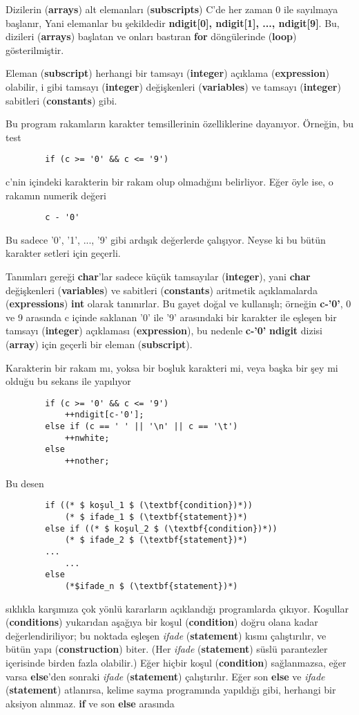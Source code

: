 \documentclass[a4paper,12pt,oneside]{book}
\begin{document}
\noindent Dizilerin (\textbf{arrays}) alt elemanları (\textbf{subscripts}) C'de her zaman 0 ile sayılmaya başlanır, Yani elemanlar bu şekildedir \textbf{ndigit[0], ndigit[1], ..., ndigit[9]}. Bu, dizileri (\textbf{arrays}) başlatan ve onları bastıran \textbf{for} döngülerinde (\textbf{loop}) gösterilmiştir.
\par Eleman (\textbf{subscript}) herhangi bir tamsayı (\textbf{integer}) açıklama (\textbf{expression}) olabilir, i gibi tamsayı (\textbf{integer}) değişkenleri (\textbf{variables}) ve tamsayı (\textbf{integer}) sabitleri (\textbf{constants}) gibi.
\par Bu program rakamların karakter temsillerinin özelliklerine dayanıyor. Örneğin, bu test
\begin{lstlisting}
		if (c >= '0' && c <= '9')
\end{lstlisting}
c'nin içindeki karakterin bir rakam olup olmadığını belirliyor. Eğer öyle ise, o rakamın numerik değeri
\begin{lstlisting}
		c - '0'
\end{lstlisting}
\noindent Bu sadece '0', '1', ..., '9' gibi ardışık değerlerde çalışıyor. Neyse ki bu bütün karakter setleri için geçerli.
\par Tanımları gereği \textbf{char}'lar sadece küçük tamsayılar (\textbf{integer}), yani \textbf{char} değişkenleri (\textbf{variables}) ve sabitleri (\textbf{constants}) aritmetik açıklamalarda (\textbf{expressions}) \textbf{int} olarak tanınırlar. Bu gayet doğal ve kullanışlı; örneğin \textbf{c-'0'}, 0 ve 9 arasında c içinde saklanan '0' ile '9' arasındaki bir karakter ile eşleşen bir tamsayı (\textbf{integer}) açıklaması (\textbf{expression}), bu nedenle \textbf{c-'0'} \textbf{ndigit} dizisi (\textbf{array}) için geçerli bir eleman (\textbf{subscript}).
\par Karakterin bir rakam mı, yoksa bir boşluk karakteri mi, veya başka bir şey mi olduğu bu sekans ile yapılıyor
\begin{lstlisting}
		if (c >= '0' && c <= '9')
			++ndigit[c-'0'];
		else if (c == ' ' || '\n' || c == '\t')
			++nwhite;
		else
			++nother;
\end{lstlisting}
Bu desen
\begin{lstlisting}
		if ((* $ koşul_1 $ (\textbf{condition})*))
			(* $ ifade_1 $ (\textbf{statement})*)
		else if ((* $ koşul_2 $ (\textbf{condition})*))
			(* $ ifade_2 $ (\textbf{statement})*)
		...
			...
		else
			(*$ifade_n $ (\textbf{statement})*)
\end{lstlisting}
sıklıkla karşımıza çok yönlü kararların açıklandığı programlarda çıkıyor. Koşullar (\textbf{conditions}) yukarıdan aşağıya bir koşul (\textbf{condition}) doğru olana kadar değerlendiriliyor; bu noktada eşleşen \textit{ifade} (\textbf{statement}) kısmı çalıştırılır, ve bütün yapı (\textbf{construction}) biter. (Her \textit{ifade} (\textbf{statement}) süslü parantezler içerisinde birden fazla olabilir.) Eğer hiçbir koşul (\textbf{condition}) sağlanmazsa, eğer varsa \textbf{else}'den sonraki \textit{ifade} (\textbf{statement}) çalıştırılır. Eğer son \textbf{else} ve \textit{ifade} (\textbf{statement}) atlanırsa, kelime sayma programında yapıldığı gibi, herhangi bir aksiyon alınmaz. \textbf{if} ve son \textbf{else} arasında
\end{document}
